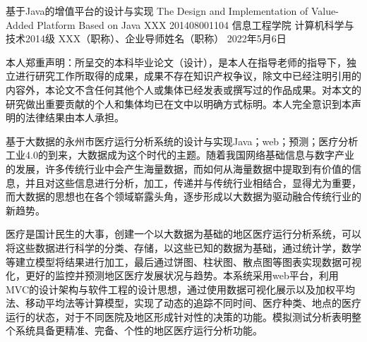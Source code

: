 \documentclass{husethesis}
\begin{document}
\pagestyle{empty}        %

\makecover
  {基于Java的增值平台的设计与实现}
  {The Design and Implementation of}
  {Value-Added Platform Based on Java}
  {XXX}
  {201408001104}
  {信息工程学院}
  {计算机科学与技术2014级}
  {XXX（职称）、企业导师姓名（职称）}
  {2022年5月6日}

\begin{integritystatement}
本人郑重声明：所呈交的本科毕业论文（设计），是本人在指导老师的指导下，独立进行研究工作所取得的成果，成果不存在知识产权争议，除文中已经注明引用的内容外，本论文不含任何其他个人或集体已经发表或撰写过的作品成果。对本文的研究做出重要贡献的个人和集体均已在文中以明确方式标明。本人完全意识到本声明的法律结果由本人承担。
\end{integritystatement}


\maketoc

\begin{cnabstract}{基于大数据的永州市医疗运行分析系统的设计与实现}{Java；web；预测；医疗分析}
工业4.0的到来，大数据成为这个时代的主题。随着我国网络基础信息与数字产业的发展，许多传统行业中会产生海量数据，而如何从海量数据中提取到有价值的信息，并且对这些信息进行分析，加工，传递并与传统行业相结合，显得尤为重要，而大数据的思想也在各个领域崭露头角，逐步形成以大数据为驱动融合传统行业的新趋势。

医疗是国计民生的大事，创建一个以大数据为基础的地区医疗运行分析系统，可以将这些数据进行科学的分类、存储，以这些已知的数据为基础，通过统计学，数学等建立模型将结果进行加工，最后通过饼图、柱状图、散点图等图表实现数据可视化，更好的监控并预测地区医疗发展状况与趋势。本系统采用web平台，利用MVC的设计架构与软件工程的设计思想，通过使用数据可视化展示以及加权平均法、移动平均法等计算模型，实现了动态的追踪不同时间、医疗种类、地点的医疗运行的状态，对于不同医院及地区形成针对性的决策的功能。模拟测试分析表明整个系统具备更精准、完备、个性的地区医疗运行分析功能。
\end{cnabstract}
\end{document}

